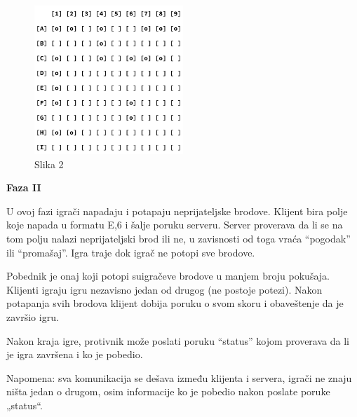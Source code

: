 \begin{figure}[H]
    \centering
    \includegraphics[width=0.5\textwidth]{Slike/PTP/PTP_Postavka.png}
    \caption*{Slika 2}
    \label{fig:ptp_postavka}
\end{figure}

\textbf{Faza II}

U ovoj fazi igrači napadaju i potapaju neprijateljske brodove. Klijent bira polje koje napada u formatu {E,6} i šalje poruku serveru. Server proverava da li se na tom polju nalazi neprijateljski brod ili ne, u zavisnosti od toga vraća “pogodak” ili “promašaj”. Igra traje dok igrač ne potopi sve brodove.

Pobednik je onaj koji potopi suigračeve brodove u manjem broju pokušaja. Klijenti igraju igru nezavisno jedan od drugog (ne postoje potezi). Nakon potapanja svih brodova klijent dobija poruku o svom skoru i obaveštenje da je završio igru.

Nakon kraja igre, protivnik može poslati poruku “status” kojom proverava da li je igra završena i ko je pobedio.

Napomena: sva komunikacija se dešava između klijenta i servera, igrači ne znaju ništa jedan o drugom, osim informacije ko je pobedio nakon poslate poruke „status“.

